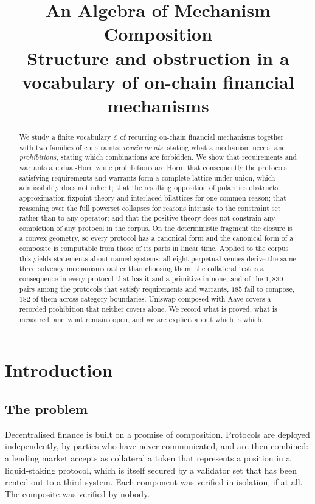 \documentclass[11pt]{article}
\title{An Algebra of Mechanism Composition\\
\large Structure and obstruction in a vocabulary of on-chain financial mechanisms}
\author{}
\date{}
\theoremstyle{definition}
\theoremstyle{plain}
\theoremstyle{remark}
\newcommand{\El}{\mathcal{E}}
\begin{document}
\maketitle

\begin{abstract}
We study a finite vocabulary $\El$ of recurring on-chain financial mechanisms
together with two families of constraints: \emph{requirements}, stating what a
mechanism needs, and \emph{prohibitions}, stating which combinations are
forbidden. We show that requirements and warrants are dual-Horn while prohibitions are
Horn; that consequently the protocols satisfying requirements and warrants form
a complete lattice under union, which admissibility does not inherit; that the resulting opposition of polarities
obstructs approximation fixpoint theory and interlaced bilattices for one common
reason; that reasoning over the full powerset collapses for reasons intrinsic to
the constraint set rather than to any operator; and that the positive theory does
not constrain any completion of any protocol in the corpus. On the deterministic
fragment the closure is a convex geometry, so every protocol has a canonical form
and the canonical form of a composite is computable from those of its parts in
linear time. Applied to the corpus this yields statements about named systems:
all eight perpetual venues derive the same three solvency mechanisms rather than
choosing them; the collateral test is a consequence in every protocol that has it
and a primitive in none; and of the $1{,}830$ pairs among the protocols that
satisfy requirements and warrants, $185$ fail to compose, $182$ of them across
category boundaries. Uniswap composed with Aave covers a recorded prohibition
that neither covers alone. We record what is proved, what is measured, and what
remains open, and we are explicit about which is which.
\end{abstract}

\section{Introduction}

\subsection{The problem}

Decentralised finance is built on a promise of composition. Protocols are
deployed independently, by parties who have never communicated, and are then
combined: a lending market accepts as collateral a token that represents a
position in a liquid-staking protocol, which is itself secured by a validator
set that has been rented out to a third system. Each component was verified in
isolation, if at all. The composite was verified by nobody.
\end{document}
